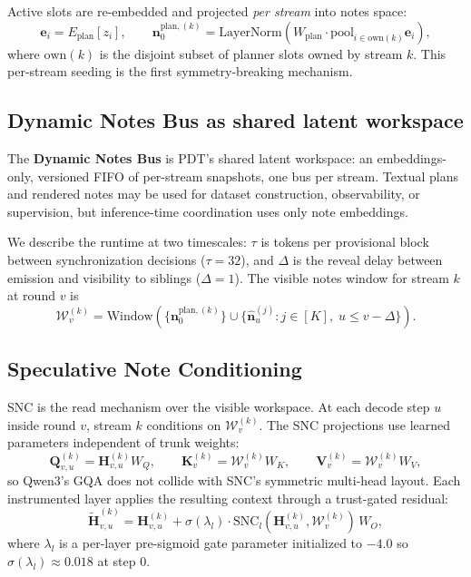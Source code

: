 Active slots are re-embedded and projected \emph{per stream} into notes space:
\[
\mathbf{e}_i = E_{\text{plan}}[z_i], \qquad
\mathbf{n}^{\text{plan},(k)}_0 = \mathrm{LayerNorm}\!\left(W_{\text{plan}} \cdot \mathrm{pool}_{i \in \mathrm{own}(k)} \mathbf{e}_i\right),
\]
where $\mathrm{own}(k)$ is the disjoint subset of planner slots owned by stream $k$. This per-stream seeding is the first symmetry-breaking mechanism.

\subsection{Dynamic Notes Bus as shared latent workspace}

The \textbf{Dynamic Notes Bus} is PDT's shared latent workspace: an embeddings-only, versioned FIFO of per-stream snapshots, one bus per stream. Textual plans and rendered notes may be used for dataset construction, observability, or supervision, but inference-time coordination uses only note embeddings.

We describe the runtime at two timescales: $\tau$ is tokens per provisional block between synchronization decisions ($\tau = 32$), and $\Delta$ is the reveal delay between emission and visibility to siblings ($\Delta = 1$). The visible notes window for stream $k$ at round $v$ is
\[
\mathcal{W}^{(k)}_v = \mathrm{Window}\!\left(\{\mathbf{n}^{\text{plan},(k)}_0\} \cup \{\widehat{\mathbf{n}}^{(j)}_u : j \in [K],\; u \le v-\Delta\}\right).
\]

\subsection{Speculative Note Conditioning}

SNC is the read mechanism over the visible workspace. At each decode step $u$ inside round $v$, stream $k$ conditions on $\mathcal{W}^{(k)}_v$. The SNC projections use learned parameters independent of trunk weights:
\[
\mathbf{Q}^{(k)}_{v,u} = \mathbf{H}^{(k)}_{v,u} W_Q, \qquad
\mathbf{K}^{(k)}_v = \mathcal{W}^{(k)}_v W_K, \qquad
\mathbf{V}^{(k)}_v = \mathcal{W}^{(k)}_v W_V,
\]
so Qwen3's GQA does not collide with SNC's symmetric multi-head layout. Each instrumented layer applies the resulting context through a trust-gated residual:
\[
\widetilde{\mathbf{H}}^{(k)}_{v,u} = \mathbf{H}^{(k)}_{v,u} + \sigma(\lambda_l) \cdot \mathrm{SNC}_l(\mathbf{H}^{(k)}_{v,u}, \mathcal{W}^{(k)}_v) \, W_O,
\]
where $\lambda_l$ is a per-layer pre-sigmoid gate parameter initialized to $-4.0$ so $\sigma(\lambda_l) \approx 0.018$ at step 0.

